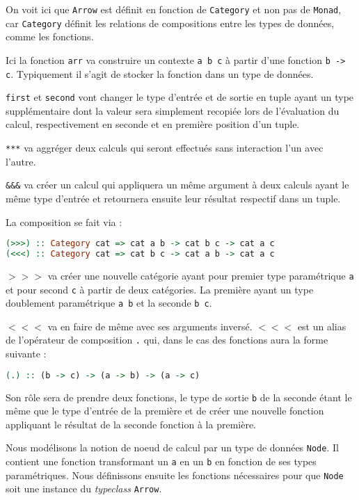 \documentclass{llncs}
\newcommand{\Arr}{\texttt{Arrow} }
\newcommand{\Arrp}{\texttt{Arrow}. }
\begin{document}
On voit ici que \Arr est définit en fonction de \texttt{Category} et non pas
de \texttt{Monad}, car \texttt{Category} définit les relations de compositions entre
les types de données, comme les fonctions.

Ici la fonction \texttt{arr} va construire un contexte \texttt{a b c} à partir d'une
fonction \texttt{b -> c}.
Typiquement il s'agit de stocker la fonction dans un type de données.

\texttt{first} et \texttt{second} vont changer le type d'entrée et de sortie
en tuple ayant un type supplémentaire dont la valeur sera simplement recopiée
lors de l'évaluation du calcul, respectivement en seconde et en première position
d'un tuple.

\texttt{***} va aggréger deux calculs qui seront effectués sans interaction l'un
avec l'autre.

\texttt{\&\&\&} va créer un calcul qui appliquera un même argument à deux calculs ayant
le même type d'entrée et retournera ensuite leur résultat respectif dans un tuple.

La composition se fait via :
\begin{lstlisting}[language=haskell]
(>>>) :: Category cat => cat a b -> cat b c -> cat a c
(<<<) :: Category cat => cat b c -> cat a b -> cat a c
\end{lstlisting}

$>>>$ va créer une nouvelle catégorie ayant pour premier type paramétrique
\texttt{a} et pour second \texttt{c} à partir de deux catégories.
La première ayant un type doublement paramétrique \texttt{a b} et la seconde
\texttt{b c}.

$<<<$ va en faire de même avec ses arguments inversé.
$<<<$ est un alias de l'opérateur de composition \texttt{.} qui, dans le cas
des fonctions aura la forme suivante :
\begin{lstlisting}[language=haskell]
(.) :: (b -> c) -> (a -> b) -> (a -> c)
\end{lstlisting}
Son rôle sera de prendre deux fonctions, le type de sortie \texttt{b} de la seconde
étant le même que le type d'entrée de la première et de créer une nouvelle fonction
appliquant le résultat de la seconde fonction à la première.

Nous modélisons la notion de noeud de calcul par un type de données
\texttt{Node}.
Il contient une fonction transformant un \texttt{a} en un \texttt{b} en fonction
de ses types paramétriques.
Nous définissons ensuite les fonctions nécessaires pour que \texttt{Node} soit
une instance du \emph{typeclass} \Arrp
\end{document}
